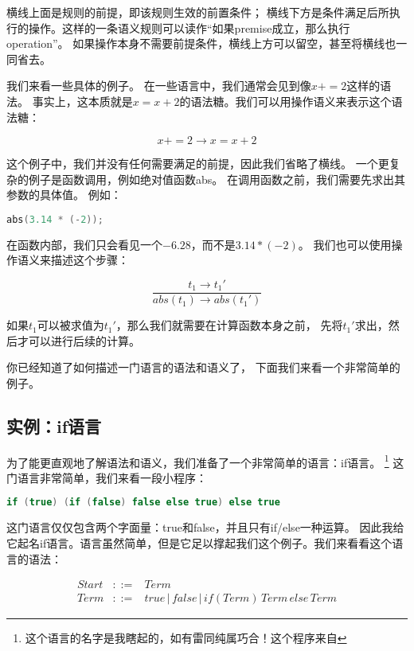 \documentclass[../main.tex]{subfiles}
\begin{document}
  \indent 横线上面是规则的前提，即该规则生效的前置条件；
  横线下方是条件满足后所执行的操作。这样的一条语义规则可以读作“如果premise成立，那么执行operation”。
  如果操作本身不需要前提条件，横线上方可以留空，甚至将横线也一同省去。

  \indent 我们来看一些具体的例子。
  在一些语言中，我们通常会见到像$x += 2$这样的语法。
  事实上，这本质就是$x = x + 2$的语法糖。我们可以用操作语义来表示这个语法糖：

  $$x += 2 \to x = x + 2$$

  \indent 这个例子中，我们并没有任何需要满足的前提，因此我们省略了横线。
  一个更复杂的例子是函数调用，例如绝对值函数abs。
  在调用函数之前，我们需要先求出其参数的具体值。
  例如：
  
\begin{lstlisting}[language=c]
abs(3.14 * (-2));
\end{lstlisting}

  \indent 在函数内部，我们只会看见一个$-6.28$，而不是$3.14 * (-2)$。
  我们也可以使用操作语义来描述这个步骤：

  $$\frac{t_1 \to t_1'}{abs(t_1) \to abs(t_1')}$$

  \indent 如果$t_1$可以被求值为$t_1'$，那么我们就需要在计算函数本身之前，
  先将$t_1'$求出，然后才可以进行后续的计算。

  \indent 你已经知道了如何描述一门语言的语法和语义了，
  下面我们来看一个非常简单的例子。

  \subsection{实例：if语言}
  \indent 为了能更直观地了解语法和语义，我们准备了一个非常简单的语言：if语言。
  \footnote[1]{这个语言的名字是我瞎起的，如有雷同纯属巧合！这个程序来自\cite{tapl}}
  这门语言非常简单，我们来看一段小程序：

\begin{lstlisting}[language=c++]
if (true) (if (false) false else true) else true
\end{lstlisting}

  \indent 这门语言仅仅包含两个字面量：true和false，并且只有if/else一种运算。
  因此我给它起名if语言。语言虽然简单，但是它足以撑起我们这个例子。我们来看看这个语言的语法：

  \begin{eqnarray}
    Start & ::= & Term \nonumber \\
    Term & ::= & true\,|\,false\,|\,if(Term)\,Term\,else\,Term \nonumber
  \end{eqnarray}
\end{document}
